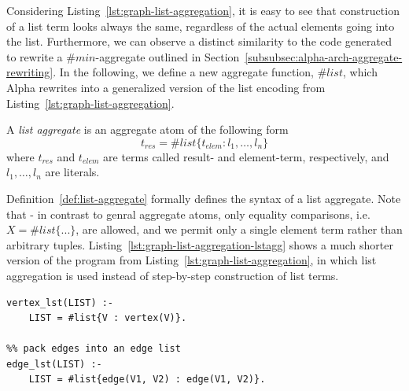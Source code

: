Considering Listing~\ref{lst:graph-list-aggregation}, it is easy to see that construction of a list term looks always the same, regardless of the actual elements going into the list. Furthermore, we can observe a distinct similarity to the code generated to rewrite a $\#min$-aggregate outlined in Section~\ref{subsubsec:alpha-arch-aggregate-rewriting}. In the following, we define a new aggregate function, $\#list$, which Alpha rewrites into a generalized version of the list encoding from Listing~\ref{lst:graph-list-aggregation}.

\begin{definition}
\label{def:list-aggregate}    
A \emph{list aggregate} is an aggregate atom of the following form
\[
    t_{res} = \#list\{ t_{elem} : l_{1},\ldots,l_{n}\}
\]
where $t_{res}$ and $t_{elem}$ are terms called result- and element-term, respectively, and $l_{1},\ldots,l_{n}$ are literals.
\end{definition}    
Definition~\ref{def:list-aggregate} formally defines the syntax of a list aggregate. Note that - in contrast to genral aggregate atoms, only equality comparisons, i.e. $X = \#list\{...\}$, are allowed, and we permit only a single element term rather than arbitrary tuples. Listing~\ref{lst:graph-list-aggregation-lstagg} shows a much shorter version of the program from Listing~\ref{lst:graph-list-aggregation}, in which list aggregation is used instead of step-by-step construction of list terms.
\begin{lstlisting}[style=asp-code, label={lst:graph-list-aggregation-lstagg}, caption={Creating vertex- and edge-lists using list aggregates.}]
%% pack vertices into a vertex list
vertex_lst(LIST) :- 
    LIST = #list{V : vertex(V)}.
    
%% pack edges into an edge list
edge_lst(LIST) :- 
    LIST = #list{edge(V1, V2) : edge(V1, V2)}.    
\end{lstlisting}

